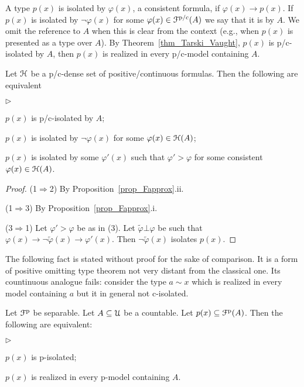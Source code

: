 \documentclass{amsproc}
\newcommand{\mylabel}[1]{{#1}\hfill}
\renewenvironment{itemize}
  {\begin{list}{$\triangleright$}{%
  \setlength{\parskip}{0mm}
  \setlength{\topsep}{.4\baselineskip}
  \setlength{\rightmargin}{0mm}
  \setlength{\listparindent}{0mm}
  \setlength{\itemindent}{0mm}
  \setlength{\labelwidth}{3ex}
  \setlength{\itemsep}{.2\baselineskip}
  \setlength{\parsep}{.2\baselineskip}
  \setlength{\partopsep}{0mm}
  \setlength{\labelsep}{1ex}
  \setlength{\leftmargin}{\labelwidth+\labelsep}
  \let\makelabel\mylabel}}{%
\end{list}}
\renewcommand*{\emph}[1]{%
   \smash{\tikz[baseline]\node[rectangle, fill=teal!25, rounded corners, inner xsep=0.5ex, inner ysep=0.2ex, anchor=base, minimum height = 2.7ex]{\strut #1};}}
\begin{document}
{A type $p(x)$ is isolated by $\varphi(x)$, a consistent formula, if $\varphi(x)\rightarrow p(x)$.
If $p(x)$ is isolated by $\neg\varphi(x)$ for some $\varphi(x)\in{\EuScript F}^{\rm p/c}(A)$ we say that it is \emph{p/c-isolated\/} by $A$.
We omit the reference to $A$ when this is clear from the context (e.g., when $p(x)$ is presented as a type over $A$).
By Theorem~\ref{thm_Tarski_Vaught}, $p(x)$ is p/c-isolated by $A$, then $p(x)$ is realized in every p/c-model containing $A$.

\begin{fact}\label{fact_isolation}
  Let ${\EuScript H}$ be a p/c-dense set of positive/continuous formulas.
  Then the following are equivalent
  \begin{itemize}
  \item[1.] $p(x)$ is p/c-isolated by $A$;
  \item[2.] $p(x)$ is isolated by $\neg\varphi(x)$ for some $\varphi(x)\in{\EuScript H}(A)$;
  \item[3.] $p(x)$ is isolated by some $\varphi'(x)$ such that  $\varphi'>\varphi$ for some consistent $\varphi(x)\in{\EuScript H}(A)$.
  \end{itemize}
\end{fact}

\begin{proof}
  (1$\Rightarrow$2) By Proposition~\ref{prop_Fapprox}.ii.

  (1$\Rightarrow$3) By Proposition~\ref{prop_Fapprox}.i.

  (3$\Rightarrow$1) Let $\varphi'>\varphi$ be as in (3). 
  Let $\tilde\varphi\bot\varphi$ be such that $\varphi(x)\rightarrow\neg\tilde\varphi(x)\rightarrow\varphi'(x)$. 
  Then $\neg\tilde\varphi(x)$ isolates $p(x)$.
\end{proof}

The following fact is stated without proof for the sake of comparison.
It is a form of positive omitting type theorem not very distant from the classical one.
Its countinuous analogue fails: consider the type $a\sim x$ which is realized in every model containing $a$ but it in general not c-isolated.

\begin{fact}
  Let ${\EuScript F}^{\rm p}$ be separable.
  Let $A\subseteq{\EuScript U}$ be a countable.
  Let $p(x)\subseteq{\EuScript F}^{\rm p}(A)$.
  Then the following are equivalent:
  \begin{itemize}
    \item[1.] $p(x)$ is p-isolated;
    \item[2.] $p(x)$ is realized in every p-model containing $A$.
  \end{itemize}
\end{fact}

}
\end{document}
